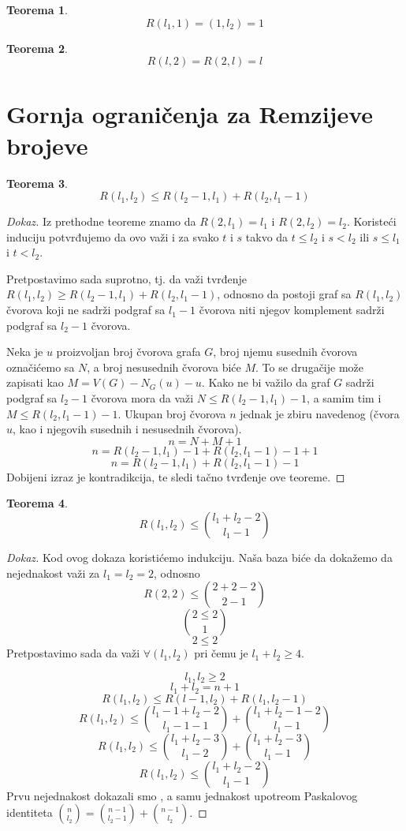 \documentclass{article}
\theoremstyle{definition}
\newtheorem{teorema}{Teorema}[section]
\newcommand{\dokaz}[1]{\begin{proof}[Dokaz]#1\end{proof}}
\begin{document}
	\begin{teorema}
	\[
	R(l_1,1)= (1,l_2) = 1
	\]
	\end{teorema}
	\begin{teorema}
	\[
	R(l,2)=R(2,l)=l
	\]
	\end{teorema}

		\newpage

		\section{Gornja ograničenja za Remzijeve brojeve}

	\begin{teorema}
	\[
	R(l_1,l_2) \leq R(l_2-1, l_1) + R(l_2, l_1-1)
	\]
	\end{teorema}
	\dokaz{
	Iz prethodne teoreme znamo da $R(2,l_1)=l_1$ i $R(2,l_2)=l_2$. Koristeći induciju potvrđujemo da ovo važi i za svako $t$ i $s$ takvo da $t\leq l_2$ i $s<l_2$ ili $s\leq l_1$ i $t<l_2$.

	Pretpostavimo sada suprotno, tj. da važi tvrđenje $R(l_1,l_2) \geq R(l_2-1, l_1) + R(l_2, l_1-1)$, odnosno da postoji graf sa $R(l_1,l_2)$ čvorova koji ne sadrži podgraf sa $l_1-1$ čvorova niti njegov komplement sadrži podgraf sa $l_2-1$ čvorova.

	Neka je $u$ proizvoljan broj čvorova grafa $G$, broj njemu susednih čvorova označićemo sa $N$, a broj nesusednih čvorova biće $M$.
	To se drugačije može zapisati kao $M=V(G)-N_G(u)-{u}$.
	Kako ne bi važilo da graf $G$ sadrži podgraf sa $l_2-1$ čvorova mora da važi $N\leq R(l_2-1, l_1)-1 $, a samim tim i $M \leq R(l_2, l_1-1)-1 $. 
	Ukupan broj čvorova $n$ jednak je zbiru navedenog (čvora $u$, kao i njegovih susednih i nesusednih čvorova).
	\[
	n= N+M+1
	\]
	\[
	n= R(l_2-1, l_1)-1 + R(l_2, l_1-1)-1+1
	\]
	\[
	n= R(l_2-1, l_1)+ R(l_2, l_1-1)-1
	\]
	Dobijeni izraz je kontradikcija, te sledi tačno tvrđenje ove teoreme.
	}


		\begin{teorema}
	\[R(l_1,l_2) \leq {l_1+l_2-2\choose l_1-1} 
	\]
	\end{teorema}
	\dokaz{
	Kod ovog dokaza koristićemo indukciju. Naša baza biće da dokažemo da nejednakost važi za $l_1=l_2=2$, odnosno
	\[ R(2,2) \leq {2+2-2 \choose 2-1}
	\]
	\[
	2 \leq 2 \choose 1
	\]
	\[
	2 \leq 2
	\]
	Pretpostavimo sada da važi $\forall(l_1,l_2)$  pri čemu je $l_1+l_2 \geq 4$.

	\[l_1,l_2 \geq 2
	\]
	\[
	l_1+l_2=n+1
	\]
	\[
	R(l_1,l_2) \leq R(l-1, l_2) + R(l_1, l_2-1)
	\]
	\[
	R(l_1,l_2) \leq {{l_1-1+l_2-2 \choose l_1-1-1} + {l_1+l_2-1-2 \choose l_1-1}}
	\]
	\[
	R(l_1,l_2) \leq {{l_1+l_2-3 \choose l_1-2} + {l_1+l_2-3 \choose l_1-1}}
	\]
	\[
	R(l_1,l_2) \leq {l_1+l_2-2 \choose l_1-1}
	\]
	Prvu nejednakost dokazali smo %
	, a samu jednakost upotreom Paskalovog identiteta ${n \choose l_2} = {n-1 \choose l_2-1} + {n-1 \choose l_2}$.
}
	
\end{document}
